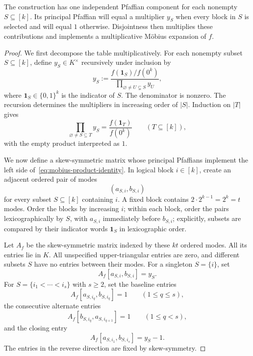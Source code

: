 \documentclass[11pt]{article}
\theoremstyle{definition}
\theoremstyle{remark}
\newcommand{\bits}{\{0,1\}}
\newcommand{\one}{\mathbf 1}
\begin{document}
The construction has one independent Pfaffian component for each nonempty
$S\subseteq[k]$.  Its principal Pfaffian will equal a multiplier $y_S$ when
every block in $S$ is selected and will equal $1$ otherwise.  Disjointness
then multiplies these contributions and implements a multiplicative
M\"obius expansion of $f$.

\begin{proof}
We first decompose the table multiplicatively.  For each nonempty subset
$S\subseteq[k]$, define $y_S\in K^{\times}$ recursively under inclusion by
\begin{equation}
  y_S
  :=
  \frac{f(\one_S)/f(0^k)}
       {\displaystyle\prod_{\varnothing\ne U\subsetneq S}y_U},
  \label{eq:multiplicative-mobius}
\end{equation}
where $\one_S\in\bits^k$ is the indicator of $S$.  The denominator is
nonzero.  The recursion determines the multipliers in increasing order of
$|S|$.  Induction on $|T|$ gives
\begin{equation}
  \prod_{\varnothing\ne S\subseteq T}y_S
  =\frac{f(\one_T)}{f(0^k)}
  \qquad(T\subseteq[k]),
  \label{eq:mobius-product-identity}
\end{equation}
with the empty product interpreted as $1$.

We now define a skew-symmetric matrix whose principal Pfaffians implement
the left side of~\eqref{eq:mobius-product-identity}.  In logical block
$i\in[k]$, create an adjacent ordered pair of modes
\[
  (a_{S,i},b_{S,i})
\]
for every subset $S\subseteq[k]$ containing $i$.  A fixed block contains
$2\cdot2^{k-1}=2^k=t$ modes.  Order the blocks by increasing $i$; within
each block, order the pairs lexicographically by $S$, with $a_{S,i}$
immediately before $b_{S,i}$; explicitly, subsets are compared by their
indicator words $\one_S$ in lexicographic order.

Let $A_f$ be the skew-symmetric matrix indexed by these $kt$ ordered modes.
All its entries lie in $K$.  All unspecified upper-triangular entries are
zero, and different subsets
$S$ have no entries between their modes.  For a singleton $S=\{i\}$, set
\begin{equation}
  A_f[a_{S,i},b_{S,i}]=y_S.
  \label{eq:singleton-component}
\end{equation}
For $S=\{i_1<\cdots<i_s\}$ with $s\ge2$, set the baseline entries
\begin{equation}
  A_f[a_{S,i_q},b_{S,i_q}]=1
  \qquad(1\le q\le s),
  \label{eq:baseline-entries}
\end{equation}
the consecutive alternate entries
\begin{equation}
  A_f[b_{S,i_q},a_{S,i_{q+1}}]=1
  \qquad(1\le q<s),
  \label{eq:alternate-path-entries}
\end{equation}
and the closing entry
\begin{equation}
  A_f[a_{S,i_1},b_{S,i_s}]=y_S-1.
  \label{eq:alternate-closing-entry}
\end{equation}
The entries in the reverse direction are fixed by skew-symmetry.


\end{proof}
\end{document}
